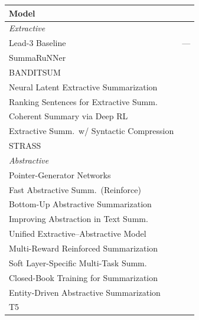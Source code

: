 \begin{table}[h]
\centering
\scriptsize
\setlength{\tabcolsep}{4pt}
\begin{tabular}{p{}l}
\toprule
\textbf{Model} & \\
\midrule
\multicolumn{2}{l}{\textit{Extractive}} \\
\midrule
Lead-3 Baseline                          & ---                               \\
SummaRuNNer                              & \citeyear{nallapati2017summarunner}   \\
BANDITSUM                                & \citeyear{dong2018banditsum}          \\
Neural Latent Extractive Summarization   & \citeyear{cheng2016neural}            \\
Ranking Sentences for Extractive Summ.  & \citeyear{narayan2018ranking}         \\
Coherent Summary via Deep RL             & \citeyear{wu2018learning}             \\
Extractive Summ.\ w/ Syntactic Compression & \citeyear{xu2019neural}             \\
STRASS                                   & \citeyear{bouscarrat2019strass}       \\
\midrule
\multicolumn{2}{l}{\textit{Abstractive}} \\
\midrule
Pointer-Generator Networks               & \citeyear{see-etal-2017-get}                 \\
Fast Abstractive Summ.\ (Reinforce)      & \citeyear{chen2018fast}               \\
Bottom-Up Abstractive Summarization      & \citeyear{gehrmann2018bottom}         \\
Improving Abstraction in Text Summ.\     & \citeyear{kryscinski2018improving}    \\
Unified Extractive--Abstractive Model    & \citeyear{hsu2018unified}             \\
Multi-Reward Reinforced Summarization    & \citeyear{pasunuru2018multi}          \\
Soft Layer-Specific Multi-Task Summ.\    & \citeyear{guo2018soft}                \\
Closed-Book Training for Summarization   & \citeyear{jiang2019closed}            \\
Entity-Driven Abstractive Summarization  & \citeyear{amplayo2021entity}          \\
T5                                       & \citeyear{Raffel2019ExploringTL}        \\

\end{tabular}
\end{table}
